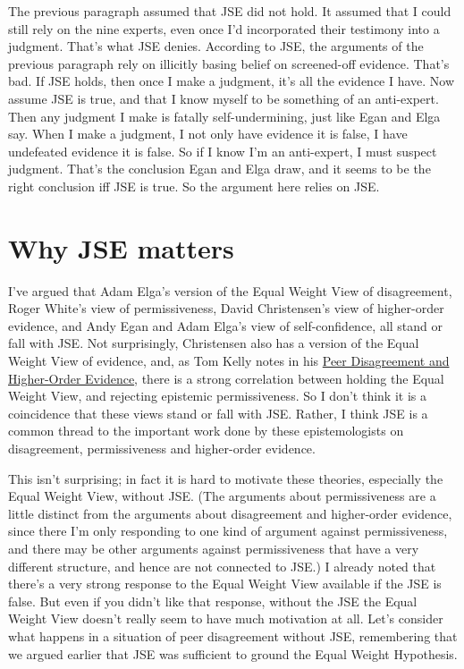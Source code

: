 The previous paragraph assumed that JSE did not hold. It assumed that I could still rely on the nine experts, even once I'd incorporated their testimony into a judgment. That's what JSE denies. According to JSE, the arguments of the previous paragraph rely on illicitly basing belief on screened-off evidence. That's bad. If JSE holds, then once I make a judgment, it's all the evidence I have. Now assume JSE is true, and that I know myself to be something of an anti-expert. Then any judgment I make is fatally self-undermining, just like Egan and Elga say. When I make a judgment, I not only have evidence it is false, I have undefeated evidence it is false. So if I know I'm an anti-expert, I must suspect judgment. That's the conclusion Egan and Elga draw, and it seems to be the right conclusion iff JSE is true. So the argument here relies on JSE. 

\section{Why JSE matters}

I've argued that Adam Elga's version of the Equal Weight View of disagreement, Roger White's view of permissiveness, David Christensen's view of higher-order evidence, and Andy Egan and Adam Elga's view of self-confidence, all stand or fall with JSE. Not surprisingly, Christensen also has a version of the Equal Weight View of evidence, and, as Tom Kelly notes in his \href{http://www.princeton.edu/~tkelly/papers/KellyPeerDis-1.doc}{Peer Disagreement and Higher-Order Evidence}, there is a strong correlation between holding the Equal Weight View, and rejecting epistemic permissiveness. So I don't think it is a coincidence that these views stand or fall with JSE. Rather, I think JSE is a common thread to the important work done by these epistemologists on disagreement, permissiveness and higher-order evidence.

This isn't surprising; in fact it is hard to motivate these theories, especially the Equal Weight View, without JSE. (The arguments about permissiveness are a little distinct from the arguments about disagreement and higher-order evidence, since there I'm only responding to one kind of argument against permissiveness, and there may be other arguments against permissiveness that have a very different structure, and hence are not connected to JSE.) I already noted that there's a very strong response to the Equal Weight View available if the JSE is false. But even if you didn't like that response, without the JSE the Equal Weight View doesn't really seem to have much motivation at all. Let's consider what happens in a situation of peer disagreement without JSE, remembering that we argued earlier that JSE was sufficient to ground the Equal Weight Hypothesis.

